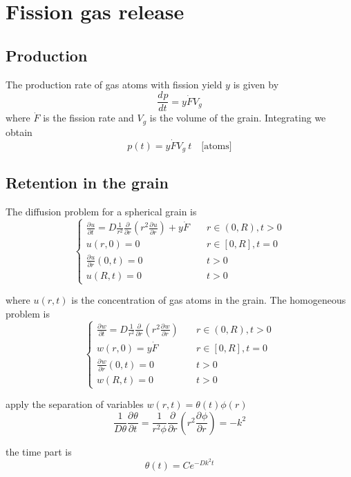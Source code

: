 \documentclass{article}
\newcommand{\deriv}[3][]{\frac{d^{#1} #2}{d #3^{#1}}}
\newcommand{\pderiv}[3][]{\frac{\partial^{#1} #2}{\partial #3^{#1}}}
\begin{document}
\section{Fission gas release}

\subsection{Production}
The production rate of gas atoms with fission yield $y$ is given by
\[
  \deriv{p}{t} = y\dot{F}V_g
\]
where $\dot{F}$ is the fission rate and $V_g$ is the volume of the grain. Integrating we obtain
\[
  p(t) = y\dot{F}V_g\:t \quad \text{[atoms]}
\]

\subsection{Retention in the grain}

The diffusion problem for a spherical grain is
\[
\begin{cases}
  \pderiv{u}{t} = D \frac{1}{r^2}\pderiv{}{r}( r^2 \pderiv{u}{r} ) + y\dot{F}  \quad & r \in (0, R), t > 0 \\
  u(r,0) = 0 \quad & r \in [0, R], t = 0 \\
  \pderiv{u}{r}(0,t) = 0 \quad & t > 0\\
  u(R, t) = 0 \quad & t > 0
\end{cases}
\]

where $u(r,t)$ is the concentration of gas atoms in the grain. The homogeneous problem is 
\[
\begin{cases}
  \pderiv{w}{t} = D \frac{1}{r^2}\pderiv{}{r}( r^2 \pderiv{w}{r} )  \quad & r \in (0, R), t > 0 \\
  w(r,0) = y\dot{F} \quad & r \in [0, R], t = 0 \\
  \pderiv{w}{r}(0,t) = 0 \quad & t > 0\\
  w(R, t) = 0 \quad & t > 0
  \end{cases}
\]

apply the separation of variables $w(r,t) = \theta(t)\phi(r)$
\[
  \frac{1}{D\theta}\pderiv{\theta}{t} = \frac{1}{r^2\phi}\pderiv{}{r}( r^2 \pderiv{\phi}{r} ) = -k^2
\]

the time part is
\[
  \theta(t) = Ce^{-Dk^2t}
\]
\end{document}
